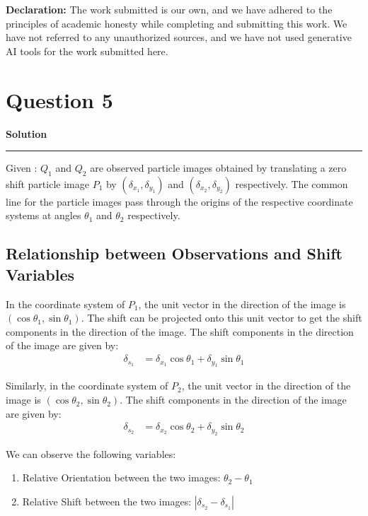 \documentclass[a4paper,12pt]{article}
\title{\cooltitle{CS754 Assignment-3}}
\author{{\bf Saksham Rathi, Ekansh Ravi Shankar, Kshitij Vaidya}}
\date{}
\newenvironment{solution}[2][]{%
    \begin{mdframed}[linecolor=blue!70!black, linewidth=2pt, roundcorner=10pt, backgroundcolor=yellow!10!white, skipabove=12pt, skipbelow=12pt]%
        \textbf{\large #2}
        \par\noindent\rule{\textwidth}{0.4pt}
}{
    \end{mdframed}
}
\begin{document}
\maketitle
\textbf{Declaration:} The work submitted is our own, and
we have adhered to the principles of academic honesty while completing and submitting this work. We have not referred to any unauthorized sources, and we have not used generative AI tools for the work submitted here.

\section*{Question 5}

\begin{solution}{Solution}

\noindent Given : $Q_1$ and $Q_2$ are observed particle images obtained by translating a zero shift particle image $P_1$ by $\left( \delta_{x_1}, \delta_{y_1}\right)$ and $\left( \delta_{x_2}, \delta_{y_2}\right)$ respectively. The common line for the particle images pass through the origins of the respective coordinate systems at angles $\theta_1$ and $\theta_2$ respectively. 

\subsection{Relationship between Observations and Shift Variables}

\noindent In the coordinate system of $P_1$, the unit vector in the direction of the image is $\left( \cos \theta_1, \sin \theta_1 \right)$. The shift can be projected onto this unit vector to get the shift components in the direction of the image. The shift components in the direction of the image are given by:
\begin{align*}
    \delta_{s_1} &= \delta_{x_1} \cos \theta_1 + \delta_{y_1} \sin \theta_1
\end{align*}

\noindent Similarly, in the coordinate system of $P_2$, the unit vector in the direction of the image is $\left( \cos \theta_2, \sin \theta_2 \right)$. The shift components in the direction of the image are given by:
\begin{align*}
    \delta_{s_2} &= \delta_{x_2} \cos \theta_2 + \delta_{y_2} \sin \theta_2
\end{align*}

\noindent We can observe the following variables:
\begin{enumerate}
  \item Relative Orientation between the two images: $\theta_2 - \theta_1$
  \item Relative Shift between the two images: $|\delta_{s_2} - \delta_{s_1}|$
\end{enumerate}


\end{solution}
\end{document}
